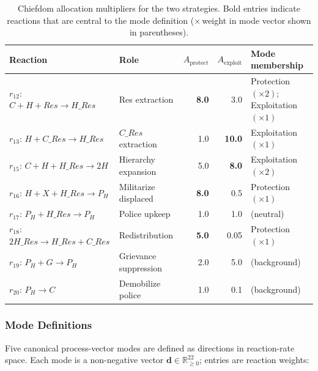 \begin{table}[h]
\centering
\caption{Chiefdom allocation multipliers for the two strategies.
         Bold entries indicate reactions that are central to the mode
         definition ($\times$\,weight in mode vector shown in parentheses).}
\label{tab:s4_allocation}
\begin{tabular}{llrrl}
\toprule
Reaction & Role & $A_\text{protect}$ & $A_\text{exploit}$ & Mode membership \\
\midrule
$r_{12}$: $C+H+\textit{Res}\to H\_\textit{Res}$   & Res extraction       & \textbf{8.0} & 3.0          & Protection $(\times 2)$; Exploitation $(\times 1)$ \\
$r_{13}$: $H+C\_\textit{Res}\to H\_\textit{Res}$ & $C\_\textit{Res}$ extraction & 1.0 & \textbf{10.0} & Exploitation $(\times 1)$ \\
$r_{15}$: $C+H+H\_\textit{Res}\to 2H$             & Hierarchy expansion  & 5.0          & \textbf{8.0} & Exploitation $(\times 2)$ \\
$r_{16}$: $H+X+H\_\textit{Res}\to P_H$            & Militarize displaced & \textbf{8.0} & 0.5          & Protection $(\times 1)$ \\
$r_{17}$: $P_H+H\_\textit{Res}\to P_H$            & Police upkeep        & 1.0          & 1.0          & (neutral) \\
$r_{18}$: $2H\_\textit{Res}\to H\_\textit{Res}+C\_\textit{Res}$ & Redistribution & \textbf{5.0} & 0.05 & Protection $(\times 1)$ \\
$r_{19}$: $P_H+G\to P_H$                          & Grievance suppression & 2.0         & 5.0          & (background) \\
$r_{20}$: $P_H\to C$                               & Demobilize police    & 1.0          & 0.1          & (background) \\
\bottomrule
\end{tabular}
\end{table}

\subsubsection*{Mode Definitions}

Five canonical process-vector modes are defined as directions in
reaction-rate space.  Each mode is a non-negative vector
$\mathbf{d} \in \mathbb{R}_{\geq 0}^{22}$; entries are reaction weights:

